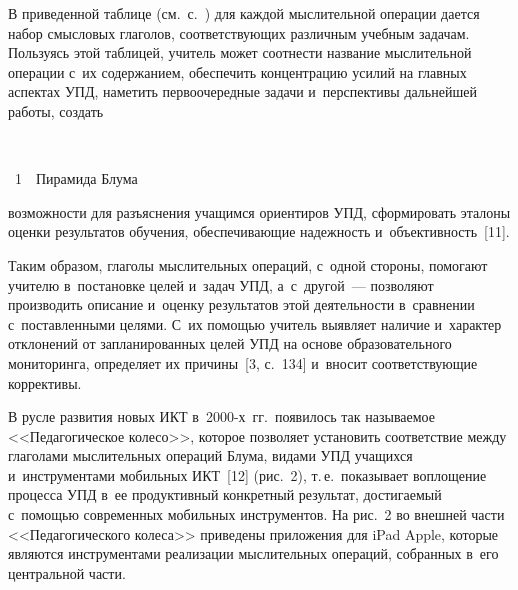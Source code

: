 \begin{multicols}{2}
  В приведенной таблице (см.\ с.~\pageref{ttb})
  для каждой мыслительной операции дается набор смысловых
глаголов, соответ\-ст\-вующих различным учебным задачам. Пользуясь этой таблицей, учитель
может соотнести название мыслительной операции с~их содержанием, обеспечить
концентрацию усилий на главных аспектах УПД, наметить
первоочередные  задачи и~перспективы дальнейшей работы, создать\linebreak\vspace*{-12pt}

\begin{center}  %
\vspace*{8pt}
\mbox{%
 \epsfxsize=72.257mm
 }



\noindent
{{\figurename~1}\ \ \small{Пирамида Блума}}

 \end{center}

\addtocounter{figure}{1}

\noindent
 возможности для
 разъяснения учащимся ориентиров УПД, сформировать эталоны оценки результатов обучения, обеспечивающие надежность
и~объективность~[11].



  Таким образом, глаголы мыслительных операций, с~одной стороны, помогают учителю в~постановке целей и~задач УПД, а~с~другой~--- позволяют производить описание и~оценку
результатов этой деятельности в~сравнении с~поставленными целями. С~их помощью учитель
выявляет наличие и~характер отклонений от запланированных целей УПД на основе
образовательного мониторинга, определяет их причины~[3, с.~134] и~вносит соответствующие
коррективы.

  В русле развития новых ИКТ в~2000-х~гг.\ появилось так называемое <<Педагогическое
колесо>>, которое позволяет установить соответствие между глаголами мыслительных
операций Блума, видами УПД учащихся и~инструментами мобильных ИКТ~[12] (рис.~2), т.\,е.\
показывает воплощение процесса УПД в~ее продуктивный конкретный результат, достигаемый
с~помощью современных мобильных инструментов. На рис.~2 во внешней части
<<Педагогического колеса>> приведены приложения для iPad Apple, которые являются
инструментами реализации мыслительных операций, собранных в~его центральной части.




\end{multicols}

